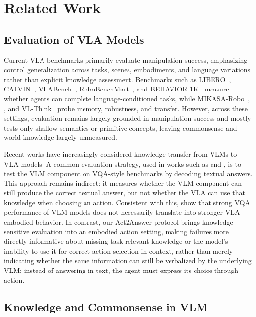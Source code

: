 \documentclass{llmxive}
\begin{document}
\section{Related Work}

\subsection{Evaluation of VLA Models}

Current VLA benchmarks primarily evaluate manipulation success, emphasizing control generalization across tasks, scenes, embodiments, and language variations rather than explicit knowledge assessment. Benchmarks such as LIBERO~\citep{libero}, CALVIN~\citep{calvin}, VLABench~\citep{vlabench}, RoboBenchMart~\citep{soshin2025robobenchmart}, and BEHAVIOR-1K~\citep{behavior1k} measure whether agents can complete language-conditioned tasks, while MIKASA-Robo~\citep{mikasa}, \citep{bringapplesofaimpact}, and VL-Think~\citep{blindvla} probe memory, robustness, and transfer. However, across these settings, evaluation remains largely grounded in manipulation success and mostly tests only shallow semantics or primitive concepts, leaving commonsense and world knowledge largely unmeasured.

Recent works have increasingly considered knowledge transfer from VLMs to VLA models. A common evaluation strategy, used in works such as \citep{cai2026xiaomi} and \citep{chen2025internvla}, is to test the VLM component on VQA-style benchmarks by decoding textual answers. This approach remains indirect: it measures whether the VLM component can still produce the correct textual answer, but not whether the VLA can use that knowledge when choosing an action. Consistent with this, \citet{zhang2026vlm4vla} show that strong VQA performance of VLM models does not necessarily translate into stronger VLA embodied behavior. In contrast, our Act2Answer protocol brings knowledge-sensitive evaluation into an embodied action setting, making failures more directly informative about missing task-relevant knowledge or the model’s inability to use it for correct action selection in context, rather than merely indicating whether the same information can still be verbalized by the underlying VLM: instead of answering in text, the agent must express its choice through action.

\subsection{Knowledge and Commonsense in VLM}
\end{document}
